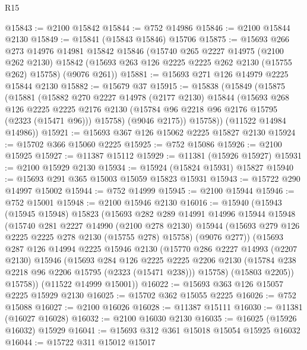 \begin{lexlean}{R15}
\begin{coremodule}
@15843 := @2100 @15842
@15844 := @752 @14986
@15846 := @2100 @15844 @2130
@15849 := @15841 (@15843 @15846) @15706
@15875 := @15693
    @266
    @273
    @14976
    @14981
    @15842
    @15846
    (@15740
      @265
      @2227
      @14975
      (@2100 @262 @2130)
      @15842
      (@15693 @263 @126 @2225 @2225 @262 @2130 (@15755 @262) @15758)
      (@9076 @261))
@15881 := @15693 @271 @126 @14979 @2225 @15844 @2130
@15882 := @15679 @37
@15915 := @15838
    (@15849
      (@15875
        (@15881
          (@15882
            @270
            @2227
            @14978
            (@2177 @2130)
            @15844
            (@15693
              @268
              @126
              @2225
              @2225
              @2176
              @2130
              (@15784 @96 @2218 @96 @2176 @15795 (@2323 (@15471 @96)))
              @15758)
            (@9046 @2175))
          @15758))
      (@11522 @14984 @14986))
@15921 := @15693 @367 @126 @15062 @2225 @15827 @2130
@15924 := @15702 @366 @15060 @2225
@15925 := @752 @15086
@15926 := @2100 @15925
@15927 := @11387 @15112
@15929 := @11381 (@15926 @15927)
@15931 := @2100 @15929 @2130
@15934 := @15924 (@15824 @15931) @15827
@15940 := @15693 @291 @365 @15003 @15059 @15823 @15931
@15943 := @15722 @290 @14997 @15002
@15944 := @752 @14999
@15945 := @2100 @15944
@15946 := @752 @15001
@15948 := @2100 @15946 @2130
@16016 := @15940
    (@15943
      (@15945 @15948)
      @15823
      (@15693
        @282
        @289
        @14991
        @14996
        @15944
        @15948
        (@15740
          @281
          @2227
          @14990
          (@2100 @278 @2130)
          @15944
          (@15693 @279 @126 @2225 @2225 @278 @2130 (@15755 @278) @15758)
          (@9076 @277))
        (@15693
          @287
          @126
          @14994
          @2225
          @15946
          @2130
          (@15770
            @286
            @2227
            @14993
            (@2207 @2130)
            @15946
            (@15693
              @284
              @126
              @2225
              @2225
              @2206
              @2130
              (@15784 @238 @2218 @96 @2206 @15795 (@2323 (@15471 @238)))
              @15758)
            (@15803 @2205))
          @15758))
      (@11522 @14999 @15001))
@16022 := @15693 @363 @126 @15057 @2225 @15929 @2130
@16025 := @15702 @362 @15055 @2225
@16026 := @752 @15088
@16027 := @2100 @16026
@16028 := @11387 @15111
@16030 := @11381 (@16027 @16028)
@16032 := @2100 @16030 @2130
@16035 := @16025 (@15926 @16032) @15929
@16041 := @15693 @312 @361 @15018 @15054 @15925 @16032
@16044 := @15722 @311 @15012 @15017

\end{coremodule}
\end{lexlean}
